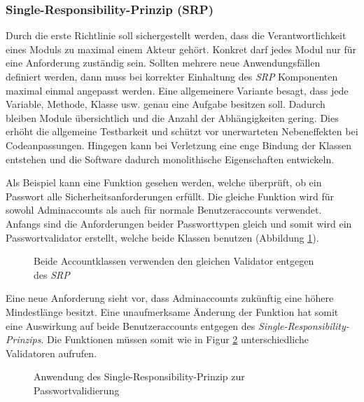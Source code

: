 \documentclass[conference]{IEEEtran}
\begin{document}
\subsubsection{Single-Responsibility-Prinzip (SRP)} Durch die erste Richtlinie soll sichergestellt werden, dass die Verantwortlichkeit eines Moduls zu maximal einem Akteur gehört. Konkret darf jedes Modul nur für eine Anforderung zuständig sein. Sollten mehrere neue Anwendungsfällen definiert werden, dann muss bei korrekter Einhaltung des \emph{SRP} Komponenten maximal einmal angepasst werden. Eine allgemeinere Variante besagt, dass jede Variable, Methode, Klasse usw. genau eine Aufgabe besitzen soll. Dadurch bleiben Module übersichtlich und die Anzahl der Abhängigkeiten gering. Dies erhöht die allgemeine Testbarkeit und schützt vor unerwarteten Nebeneffekten bei Codeanpassungen. Hingegen kann bei Verletzung eine enge Bindung der Klassen entstehen und die Software dadurch monolithische Eigenschaften entwickeln. 

Als Beispiel kann eine Funktion gesehen werden, welche überprüft, ob ein Passwort alle Sicherheitsanforderungen erfüllt. Die gleiche Funktion wird für sowohl Adminaccounts als auch für normale Benutzeraccounts verwendet. Anfangs sind die Anforderungen beider Passworttypen gleich und somit wird ein Passwortvalidator erstellt, welche beide Klassen benutzen (Abbildung \ref{fig:VorSRP}).

\begin{figure}[htbp]
	\small
	
	\caption{Beide Accountklassen verwenden den gleichen Validator entgegen des \emph{SRP}}
	\label{fig:VorSRP}
\end{figure}


Eine neue Anforderung sieht vor, dass Adminaccounts zukünftig eine höhere Mindestlänge besitzt. Eine unaufmerksame Änderung der Funktion hat somit eine Auswirkung auf beide Benutzeraccounts entgegen des \emph{Single-Responsibility-Prinzips}. Die Funktionen müssen somit wie in Figur \ref{fig:NachSRP} unterschiedliche Validatoren aufrufen. 

\begin{figure}[htbp]
	\small
	
	\caption{Anwendung des Single-Responsibility-Prinzip zur Passwortvalidierung}
	\label{fig:NachSRP}
\end{figure}
\end{document}
